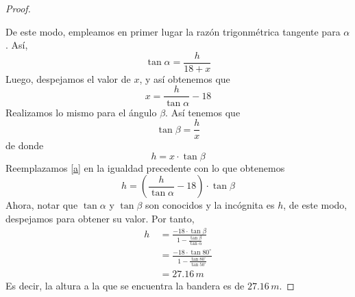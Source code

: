 \documentclass[12pt]{article}
\begin{document}
\begin{enumerate}[leftmargin=*]
\begin{proof}
\begin{center}

    \end{center}
    De este modo, empleamos en primer lugar la raz\'on trigonm\'etrica tangente para $\alpha$. As\'i, 
    \[
    \tan \alpha = \frac{h}{18 + x}
    \]
    Luego, despejamos el valor de $x$, y as\'i obtenemos que 
    \begin{equation}\label{a}
         x= \frac{h}{\tan \alpha} - 18
    \end{equation}
    Realizamos lo mismo para el \'angulo $\beta$.  As\'i tenemos que \[
    \tan \beta = \frac{h}{x}
    \]
    de donde \[
    h= x \cdot \tan \beta
    \]
   Reemplazamos  \eqref{a} en la igualdad precedente con lo que obtenemos 
   \[
   h = \left( \frac{h}{\tan \alpha} - 18 \right) \cdot \tan \beta
   \]
   Ahora, notar que $\tan \alpha$ y $\tan \beta$ son conocidos y la inc\'ognita es $h$, de este modo, despejamos para obtener su valor. Por tanto, 
   \begin{align*}
       h
       &\ = \frac{-18 \cdot \tan \beta}{1- \frac{\tan \beta}{\tan \alpha}}\\
       &\ = \frac{-18 \cdot \tan 80^\circ}{1- \frac{\tan 80^\circ}{\tan 50^\circ}}\\
       &\ = 27.16 \, m
   \end{align*}
   Es decir, la altura a la que se encuentra la bandera es de $27.16 \, m$.
\end{proof}
\end{enumerate}
    
\end{document}
